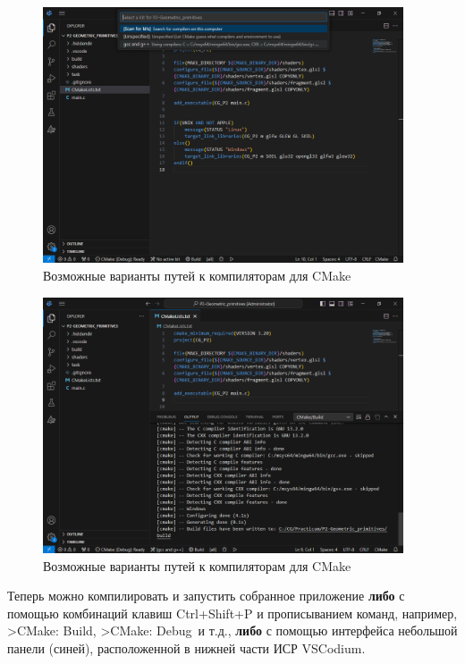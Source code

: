 \documentclass[a4paper,12pt]{article}
\begin{document}
\begin{figure} [H]
	\centering
	\includegraphics[width=0.95\textwidth]{images/CMake_compiler_paths.png}
	\caption {Возможные варианты путей к компиляторам для CMake}
	\label{fig:CMake_compiler_paths}
\end{figure}

\begin{figure} [H]
	\centering
	\includegraphics[width=0.95\textwidth]{images/CMake_build.png}
	\caption {Возможные варианты путей к компиляторам для CMake}
	\label{fig:CMake_build}
\end{figure}

Теперь можно компилировать и запустить собранное приложение \textbf{либо} с помощью комбинаций клавиш Ctrl+Shift+P и прописыванием команд, например,  \textquotedbl>CMake: Build\textquotedbl, \textquotedbl >CMake: Debug\textquotedbl~и т.д., \textbf{либо} с помощью интерфейса небольшой панели (синей), расположенной в нижней части ИСР VSCodium.
\end{document}
